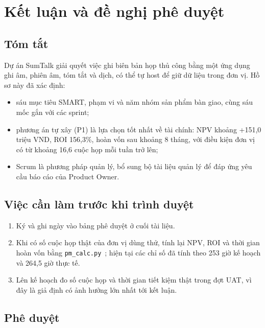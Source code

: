 \documentclass[12pt,a4paper]{report}
\begin{document}
\chapter{Kết luận và đề nghị phê duyệt}
\label{chap:conclusion}

\section{Tóm tắt}

Dự án SumTalk giải quyết việc ghi biên bản họp thủ công bằng một ứng dụng ghi âm, phiên âm, tóm tắt và dịch,
có thể tự host để giữ dữ liệu trong đơn vị. Hồ sơ này đã xác định:
\begin{itemize}
  \item sáu mục tiêu SMART, phạm vi và năm nhóm sản phẩm bàn giao, cùng sáu mốc gắn với các sprint;
  \item phương án tự xây (P1) là lựa chọn tốt nhất về tài chính: NPV khoảng +151,0 triệu VND, ROI 156,3\%, hoàn vốn
        sau khoảng 8 tháng, với điều kiện đơn vị có từ khoảng 16,6 cuộc họp mỗi tuần trở lên;
  \item Scrum là phương pháp quản lý, bổ sung bộ tài liệu quản lý để đáp ứng yêu cầu báo cáo của Product Owner.
\end{itemize}

\section{Việc cần làm trước khi trình duyệt}

\begin{enumerate}
  \item Ký và ghi ngày vào bảng phê duyệt ở cuối tài liệu.
  \item Khi có số cuộc họp thật của đơn vị dùng thử, tính lại NPV, ROI và thời gian hoàn vốn bằng
        \texttt{pm\_calc.py}~\cite{pmcalc}; hiện tại các chỉ số đã tính theo 253 giờ kế hoạch và 264,5 giờ thực tế.
  \item Lên kế hoạch đo số cuộc họp và thời gian tiết kiệm thật trong đợt UAT, vì đây là giả định có ảnh hưởng lớn
        nhất tới kết luận.
\end{enumerate}

\section{Phê duyệt}
\end{document}
